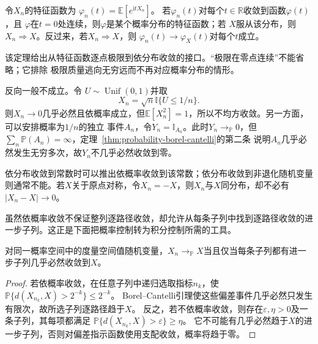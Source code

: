 \begin{theorem}[L\'evy连续性定理]
  \label{thm:probability-levy-continuity}
  令\(X_n\)的特征函数为
  \(\varphi_n(t)=\mathbb{E}[e^{\mathrm{i}tX_n}]\)。
  若\(\varphi_n(t)\)对每个\(t\in\mathbb{R}\)收敛到函数\(\varphi(t)\)，且
  \(\varphi\)在\(t=0\)处连续，则\(\varphi\)是某个概率分布的特征函数；若
  \(X\)服从该分布，则\(X_n\Rightarrow X\)。反过来，若\(X_n\Rightarrow X\)，则
  \(\varphi_n(t)\to\varphi_X(t)\)对每个\(t\)成立。
\end{theorem}

该定理给出从特征函数逐点极限到依分布收敛的接口。“极限在零点连续”不能省略；它排除
极限质量逃向无穷远而不再对应概率分布的情形。

反向一般不成立。令
\(U\sim\operatorname{Unif}(0,1)\)并取
\[ X_n=\sqrt{n}\mathbb{I}\{U\leq1/n\}. \]
则\(X_n\to0\)几乎必然且依概率成立，但\(\mathbb{E}[X_n^2]=1\)，所以不均方收敛。另一方面，可以安排概率为\(1/n\)的独立
事件\(A_n\)，令\(Y_n=\mathbb{I}_{A_n}\)。此时\(Y_n\to_{\mathbb{P}}0\)，但
\(\sum_n\mathbb{P}(A_n)=\infty\)，定理~\ref{thm:probability-borel-cantelli}的第二条
说明\(A_n\)几乎必然发生无穷多次，故\(Y_n\)不几乎必然收敛到零。

依分布收敛到常数时可以推出依概率收敛到该常数；依分布收敛到非退化随机变量则通常不能。若\(X\)关于原点对称，令\(X_n=-X\)，则\(X_n\)与\(X\)同分布，却不必有\(|X_n-X|\to0\)。

虽然依概率收敛不保证整列逐路径收敛，却允许从每条子列中找到逐路径收敛的进一步子列。这正是下面把概率控制转为积分控制所需的工具。
\begin{lemma}[依概率收敛的子列判据]
 \label{lem:rv-probability-subsequence}
 对同一概率空间中的度量空间值随机变量，\(X_n\to_{\mathbb P}X\)当且仅当每条子列都有进一步子列几乎必然收敛到\(X\)。
\end{lemma}
\begin{proof}
若依概率收敛，在任意子列中递归选取指标\(n_k\)，使
\(\mathbb P\{d(X_{n_k},X)>2^{-k}\}\leq2^{-k}\)。
Borel--Cantelli引理使这些偏差事件几乎必然只发生有限次，故所选子列逐路径趋于\(X\)。
反之，若不依概率收敛，则存在\(\varepsilon,\eta>0\)及一条子列，其每项都满足
\(\mathbb P\{d(X_{n_k},X)>\varepsilon\}\geq\eta\)。
它不可能有几乎必然趋于\(X\)的进一步子列，否则对偏差指示函数使用支配收敛，概率将趋于零。
\end{proof}

